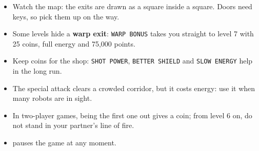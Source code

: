 
\begin{itemize}
\item Watch the map: the exits are drawn as a square inside a square. Doors need keys, so pick them up on the way.
\item Some levels hide a \textbf{warp exit}: \texttt{WARP BONUS} takes you straight to level 7 with 25 coins, full energy and 75,000 points.
\item Keep coins for the shop: \texttt{SHOT POWER}, \texttt{BETTER SHIELD} and \texttt{SLOW ENERGY} help in the long run.
\item The special attack clears a crowded corridor, but it costs energy: use it when many robots are in sight.
\item In two-player games, being the first one out gives a coin; from level 6 on, do not stand in your partner's line of fire.
\item {} pauses the game at any moment.
\end{itemize}
